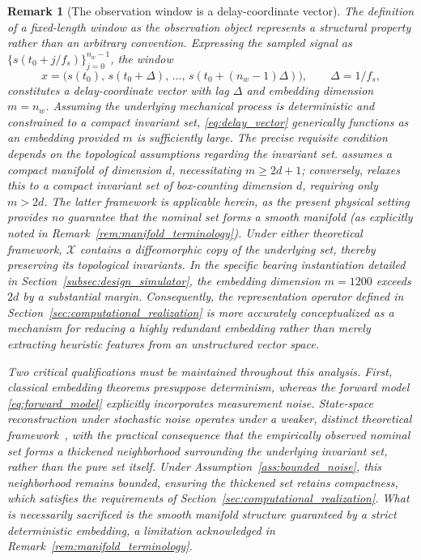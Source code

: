 \documentclass[a4paper]{cas-sc}
\newtheorem{remark}{Remark}
\newcommand{\X}{\ensuremath{\mathcal{X}}}
\begin{document}
\begin{remark}[The observation window is a delay-coordinate vector]
\label{rem:delay_embedding}
The definition of a fixed-length window as the observation object represents a structural property rather than an arbitrary convention. Expressing the sampled signal as \(\{s(t_0+j/f_s)\}_{j=0}^{n_w-1}\), the window
\begin{equation}
x = \bigl(s(t_0),\,s(t_0+\Delta),\,\ldots,\,s(t_0+(n_w-1)\Delta)\bigr),
\qquad \Delta = 1/f_s,
\label{eq:delay_vector}
\end{equation}
constitutes a delay-coordinate vector with lag \(\Delta\) and embedding dimension \(m=n_w\). Assuming the underlying mechanical process is deterministic and constrained to a compact invariant set, \eqref{eq:delay_vector} generically functions as an embedding provided \(m\) is sufficiently large. The precise requisite condition depends on the topological assumptions regarding the invariant set. \citet{takens1981} assumes a compact \emph{manifold} of dimension \(d\), necessitating \(m\ge 2d+1\); conversely, \citet{sauer1991} relaxes this to a compact invariant set of box-counting dimension \(d\), requiring only \(m>2d\). The latter framework is applicable herein, as the present physical setting provides no guarantee that the nominal set forms a smooth manifold (as explicitly noted in Remark~\ref{rem:manifold_terminology}). Under either theoretical framework, \(\X\) contains a diffeomorphic copy of the underlying set, thereby preserving its topological invariants. In the specific bearing instantiation detailed in Section~\ref{subsec:design_simulator}, the embedding dimension \(m=1200\) exceeds \(2d\) by a substantial margin. Consequently, the representation operator defined in Section~\ref{sec:computational_realization} is more accurately conceptualized as a mechanism for reducing a highly redundant embedding rather than merely extracting heuristic features from an unstructured vector space.

Two critical qualifications must be maintained throughout this analysis. First, classical embedding theorems presuppose determinism, whereas the forward model \eqref{eq:forward_model} explicitly incorporates measurement noise. State-space reconstruction under stochastic noise operates under a weaker, distinct theoretical framework~\citep{casdagli1991}, with the practical consequence that the empirically observed nominal set forms a thickened neighborhood surrounding the underlying invariant set, rather than the pure set itself. Under Assumption~\ref{ass:bounded_noise}, this neighborhood remains bounded, ensuring the thickened set retains compactness, which satisfies the requirements of Section~\ref{sec:computational_realization}. What is necessarily sacrificed is the smooth manifold structure guaranteed by a strict deterministic embedding, a limitation acknowledged in Remark~\ref{rem:manifold_terminology}.


\end{remark}
\end{document}
